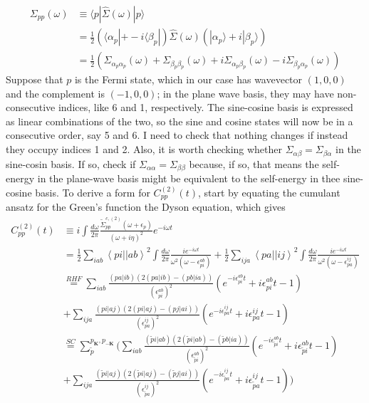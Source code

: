 \begin{align}
    \Sigma_{p p}(\omega)&\equiv\langle p| \hat{\Sigma}(\omega)|p\rangle \\
&= \frac{1}{2} \left( \langle \alpha_p| + -i \langle \beta_p| \right) \hat{\Sigma}(\omega) \left( |\alpha_p\rangle + i |\beta_p\rangle \right) \\
&= \frac{1}{2} \left( \Sigma_{\alpha_p \alpha_p}(\omega) + \Sigma_{\beta_p \beta_p}(\omega) + i \Sigma_{\alpha_p \beta_p}(\omega) - i \Sigma_{\beta_p \alpha_p}(\omega) \right)
\end{align}
Suppose that $p$ is the Fermi state, which in our case has wavevector $(1,0,0)$ and the complement is $(-1,0,0)$; in the plane wave basis, they may have non-consecutive indices, like 6 and 1, respectively. The sine-cosine basis is expressed as linear combinations of the two, so the sine and cosine states will now be in a consecutive order, say 5 and 6. I need to check that nothing changes if instead they occupy indices 1 and 2. Also, it is worth checking whether $\Sigma_{\alpha\beta} = \Sigma_{\beta\alpha}$ in the sine-cosin basis. If so, check if $\Sigma_{\alpha\alpha}=\Sigma_{\beta\beta}$ because, if so, that means the self-energy in the plane-wave basis might be equivalent to the self-energy in thee sine-cosine basis. 
To derive a form for $C_{pp}^{(2)}(t)$, start by equating the cumulant ansatz for the Green's function the Dyson equation, which gives
\begin{align}
C_{pp}^{(2)}(t) &\equiv i \int \frac{d\omega}{2\pi} \frac{ \tilde{\Sigma}_{pp}^{c,(2)}\left(\omega+\epsilon_p\right)}{(\omega + i \eta)^2} e^{-i \omega t} \\
 &= \frac{1}{2} \sum_{iab} \left< pi \left| \right| ab \right>^2 \int \frac{d\omega}{2\pi} \frac{i e^{-i \omega t}}{\omega^2\left(\omega-\epsilon_{pi}^{ab}\right)} + \frac{1}{2} \sum_{ija} \left< pa \left| \right| ij \right>^2 \int \frac{d\omega}{2\pi} \frac{i e^{-i \omega t}}{\omega^2\left(\omega-\epsilon_{pa}^{ij}\right)} \\
&\overset{RHF}{=} \sum_{iab} \frac{(pa|ib)\left(2(pa|ib)- (pb|ia)\right)}{\left(\epsilon_{pi}^{ab}\right)^2}
\left(e^{-i \epsilon_{pi}^{ab} t} +i \epsilon_{pi}^{ab} t -1 \right)
\\&+\sum_{ija} \frac{(pi|aj)\left(2(pi|aj)- (pj|ai)\right)}{\left(\epsilon_{pa}^{ij}\right)^2}
\left(e^{-i \epsilon_{pa}^{ij} t} +i \epsilon_{pa}^{ij} t -1 \right) \\
&\overset{SC}{=} \sum_{\tilde{p}}^{p_{\bm{K}}, p_{\bm{-K}}} \Bigg(\sum_{iab} \frac{(\tilde{p}i|ab)\left(2(\widetilde{p}i|ab)- (\widetilde{p}b|ia)\right)}{\left(\epsilon_{\widetilde{p}i}^{ab}\right)^2}
\left(e^{-i \epsilon_{\widetilde{p}i}^{ab} t} +i \epsilon_{\widetilde{p}i}^{ab} t -1 \right) \\& + \sum_{ija} \frac{(\tilde{p}i|aj)\left(2(\widetilde{p}i|aj)- (\widetilde{p}j|ai)\right)}{\left(\epsilon_{\widetilde{p}a}^{ij}\right)^2}
\left(e^{-i \epsilon_{\widetilde{p}a}^{ij} t} +i \epsilon_{\widetilde{p}a}^{ij} t -1 \right)\Bigg)  
\label{eq:cumulant_2nd_final}
\end{align}
